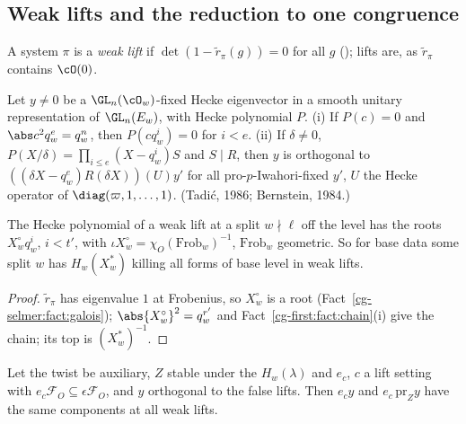 \subsection{Weak lifts and the reduction to one congruence}\label{cg-first:ss:reduction}

A system $\pi$ is a \emph{weak lift} if $\det(1-\tilde r_\pi(g))=0$ for all $g$ ();
lifts are, as $\tilde r_\pi$ contains $\cO(0)$.

\begin{fact}\label{cg-first:fact:chain}
Let $y\neq0$ be a $\GL_n(\cO_w)$-fixed Hecke eigenvector in a smooth unitary representation of
$\GL_n(E_w)$, with Hecke polynomial $P$. (i) If $P(c)=0$ and $\abs c^2q_w^e=q_w^n$, then
$P(cq_w^i)=0$ for $i<e$. (ii) If $\delta\neq0$, $P(X/\delta)=\prod_{i\le e}(X-q_w^i)S$ and $S\mid R$, then $y$ is
orthogonal to $((\delta X-q_w^e)R(\delta X))(U)y'$ for all pro-$p$-Iwahori-fixed $y'$, $U$ the Hecke operator of
$\diag(\varpi,1,\dots,1)$. (Tadi\'c, 1986; Bernstein, 1984.)
\end{fact}

\begin{lemma}
\label{cg-first:lem:chain}
The Hecke polynomial of a weak lift at a split $w\nmid\ell$ off the level has the roots $X^\circ_wq_w^i$,
$i<t'$, with $\iota X^\circ_w=\chi_O(\mathrm{Frob}_w)^{-1}$, $\mathrm{Frob}_w$ geometric. So for base data some split $w$ has
$H_w(X^*_w)$ killing all forms of base level in weak lifts.
\end{lemma}

\begin{proof}
$\tilde r_\pi$ has eigenvalue $1$ at Frobenius, so $X^\circ_w$ is a root (Fact~\ref{cg-selmer:fact:galois});
$\abs{X^\circ_w}^2=q_w^{r'}$ and Fact~\ref{cg-first:fact:chain}(i) give the chain; its top is $(X^*_w)^{-1}$.
\end{proof}

\begin{lemma}\label{cg-first:lem:weak}
Let the twist be auxiliary, $Z$ stable under the $H_w(\lambda)$ and $e_c$, $c$ a lift setting with $e_c\mathcal F_O\subseteq
\epsilon\mathcal F_O$, and $y$ orthogonal to the false lifts. Then $e_cy$ and $e_c\,\mathrm{pr}_Zy$
have the same components at all weak lifts.
\end{lemma}

